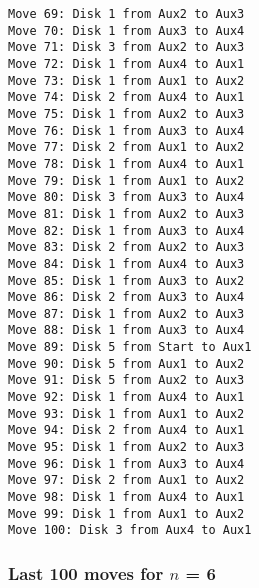 \documentclass[11pt]{article}
\begin{document}
\begin{multicols}{2}
\begin{Verbatim}[fontsize=\small]
Move 69: Disk 1 from Aux2 to Aux3
Move 70: Disk 1 from Aux3 to Aux4
Move 71: Disk 3 from Aux2 to Aux3
Move 72: Disk 1 from Aux4 to Aux1
Move 73: Disk 1 from Aux1 to Aux2
Move 74: Disk 2 from Aux4 to Aux1
Move 75: Disk 1 from Aux2 to Aux3
Move 76: Disk 1 from Aux3 to Aux4
Move 77: Disk 2 from Aux1 to Aux2
Move 78: Disk 1 from Aux4 to Aux1
Move 79: Disk 1 from Aux1 to Aux2
Move 80: Disk 3 from Aux3 to Aux4
Move 81: Disk 1 from Aux2 to Aux3
Move 82: Disk 1 from Aux3 to Aux4
Move 83: Disk 2 from Aux2 to Aux3
Move 84: Disk 1 from Aux4 to Aux3
Move 85: Disk 1 from Aux3 to Aux2
Move 86: Disk 2 from Aux3 to Aux4
Move 87: Disk 1 from Aux2 to Aux3
Move 88: Disk 1 from Aux3 to Aux4
Move 89: Disk 5 from Start to Aux1
Move 90: Disk 5 from Aux1 to Aux2
Move 91: Disk 5 from Aux2 to Aux3
Move 92: Disk 1 from Aux4 to Aux1
Move 93: Disk 1 from Aux1 to Aux2
Move 94: Disk 2 from Aux4 to Aux1
Move 95: Disk 1 from Aux2 to Aux3
Move 96: Disk 1 from Aux3 to Aux4
Move 97: Disk 2 from Aux1 to Aux2
Move 98: Disk 1 from Aux4 to Aux1
Move 99: Disk 1 from Aux1 to Aux2
Move 100: Disk 3 from Aux4 to Aux1
\end{Verbatim}

\subsubsection*{Last 100 moves for $n$ = 6}


\end{multicols}
\end{document}
